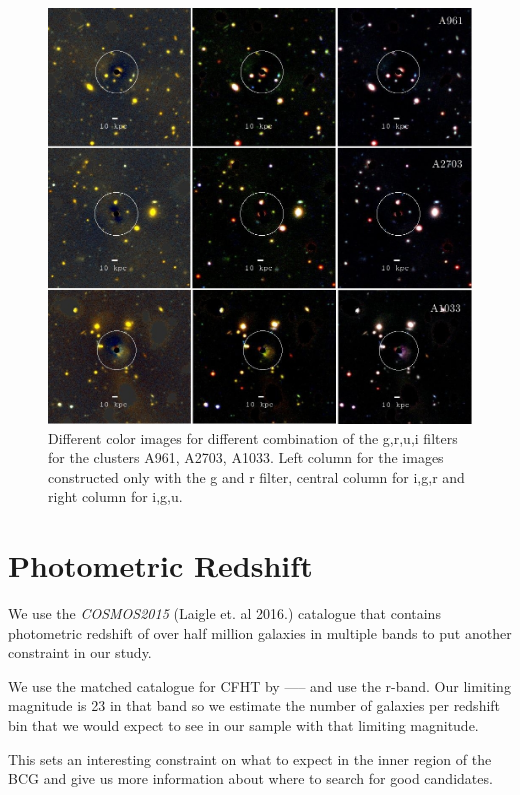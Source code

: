 \begin{figure}[H]
\centering
\includegraphics[width=15cm]{images/full_small.jpg}
\caption[Color images for various clusters]{Different color images for different combination of the g,r,u,i filters for the clusters A961, A2703, A1033. Left column for the images constructed only with the g and r filter, central column for i,g,r and right column for i,g,u.}
\end{figure}

\section{Photometric Redshift}

We use the \textit{COSMOS2015} (Laigle et. al 2016.) catalogue that contains photometric redshift of over half million galaxies in multiple bands to put another constraint in our study.

We use the matched catalogue for CFHT by ----- and use the r-band. Our limiting magnitude is 23 in that band so we estimate the number of galaxies per redshift bin that we would expect to see in our sample with that limiting magnitude.

This sets an interesting constraint on what to expect in the inner region of the BCG and give us more information about where to search for good candidates.

